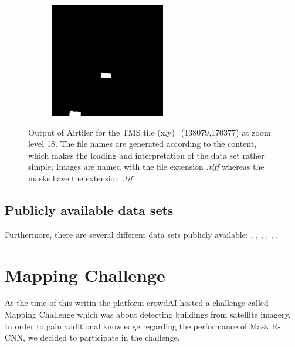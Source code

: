 \begin{figure}[H]
\begin{subfigure}[b]{0.475\textwidth}
            \includegraphics[width=\textwidth]{chapters/theoretical_and_experimental_results/images/18_138079_170377_swimming_pool.png}
            \caption{}
            \label{fig:results:airtiler_output_pool}
        \end{subfigure}
        \caption{Output of Airtiler for the TMS tile (x,y)=(138079,170377) at zoom level 18. The file names are generated according to the content, which makes the loading and interpretation of the data set rather simple; Images are named with the file extension \textit{.tiff} whereas the masks have the extension \textit{.tif}}
        \label{fig:results:airtiler_output_description}
    \end{figure}

\subsection{Publicly available data sets}
Furthermore, there are several different data sets publicly available: \cite{VolodymyrMnih.2013}, \cite{spacenet}, \cite{isprs-vaihingen}, \cite{isprs-potsdam}, \cite{Helber.20170831}, \cite{deepsat}.

\section{Mapping Challenge}
At the time of this writin the platform crowdAI hosted a challenge called Mapping Challenge \cite{mappingchallenge} which was about detecting buildings from satellite imagery. In order to gain additional knowledge regarding the performance of Mask R-CNN, we decided to participate in the challenge.

